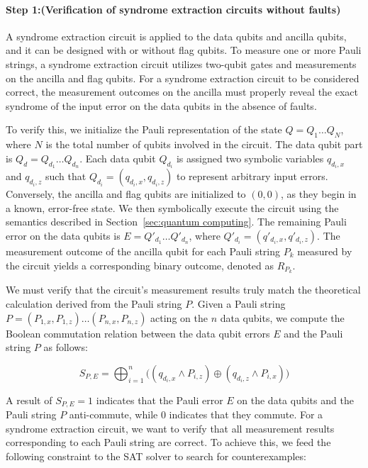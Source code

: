 \documentclass[acmsmallw,review]{acmart}
\begin{document}
\paragraph{\textbf{Step 1:(Verification of syndrome extraction circuits without faults)}}
A syndrome extraction circuit is applied to the data qubits and ancilla qubits, and it can be designed with or without flag qubits. To measure one or more Pauli strings, a syndrome extraction circuit utilizes two-qubit gates and measurements on the ancilla and flag qubits. For a syndrome extraction circuit to be considered correct, the measurement outcomes on the ancilla must properly reveal the exact syndrome of the input error on the data qubits in the absence of faults. 

To verify this, we initialize the Pauli representation of the state $Q = Q_1 \dots Q_N$, where $N$ is the total number of qubits involved in the circuit. The data qubit part is $Q_d = Q_{d_1} \dots Q_{d_n}$. Each data qubit $Q_{d_i}$ is assigned two symbolic variables $q_{d_i, x}$ and $q_{d_i, z}$ such that $Q_{d_i} = (q_{d_i, x}, q_{d_i, z})$ to represent arbitrary input errors. Conversely, the ancilla and flag qubits are initialized to $(0, 0)$, as they begin in a known, error-free state. We then symbolically execute the circuit using the semantics described in Section~\ref{sec:quantum computing}. The remaining Pauli error on the data qubits is $E = Q'_{d_1} \dots Q'_{d_n}$, where $Q'_{d_i} = (q'_{d_i, x}, q'_{d_i, z})$. The measurement outcome of the ancilla qubit for each Pauli string $P_k$ measured by the circuit yields a corresponding binary outcome, denoted as $R_{P_k}$.

We must verify that the circuit's measurement results truly match the theoretical calculation derived from the Pauli string $P$. Given a Pauli string $P = (P_{1,x}, P_{1,z}) \dots (P_{n,x}, P_{n,z})$ acting on the $n$ data qubits, we compute the Boolean commutation relation between the data qubit errors $E$ and the Pauli string $P$ as follows:

\begin{equation}
S_{P,E} = \bigoplus_{i=1}^n \big( ( q_{d_i, x} \land P_{i,z}) \oplus (q_{d_i, z} \land P_{i,x}) \big)
\end{equation}

A result of $S_{P,E} = 1$ indicates that the Pauli error $E$ on the data qubits and the Pauli string $P$ anti-commute, while $0$ indicates that they commute. For a syndrome extraction circuit, we want to verify that all measurement results corresponding to each Pauli string are correct. To achieve this, we feed the following constraint to the SAT solver to search for counterexamples:
\end{document}
